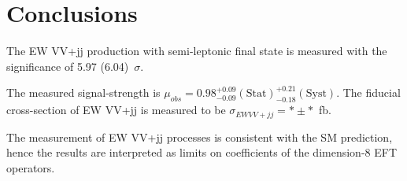 \chapter{Conclusions}
\label{chap:conclusions}

The EW VV+jj production with semi-leptonic final state is measured with the significance of 5.97 (6.04)~$\sigma$.

The measured signal-strength is $\mu_{obs} = 0.98^{+ 0.09}_{- 0.09}(\mathrm{Stat})^{+ 0.21}_{- 0.18}(\mathrm{Syst})$. 
The fiducial cross-section of EW VV+jj is measured to be $\sigma_{EW VV+jj} = * \pm * $~fb.

The measurement of EW VV+jj processes is consistent with the SM prediction, hence the results are interpreted as limits on coefficients of the dimension-8 EFT operators.

